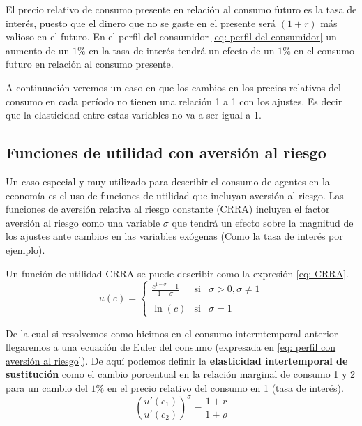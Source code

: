 El precio relativo de consumo presente en relación al consumo futuro es la tasa de interés, puesto que el dinero que no se gaste en el presente será $(1+r)$ más valioso en el futuro. En el perfil del consumidor \ref{eq: perfil del consumidor} un aumento de un $1\%$ en la tasa de interés tendrá un efecto de un $1\%$ en el consumo futuro en relación al consumo presente.

A continuación veremos un caso en que los cambios en los precios relativos del consumo en cada período no tienen una relación 1 a 1 con los ajustes. Es decir que la elasticidad entre estas variables no va a ser igual a 1.

\subsection{Funciones de utilidad con aversión al riesgo}

Un caso especial y muy utilizado para describir el consumo de agentes en la economía es el uso de funciones de utilidad que incluyan aversión al riesgo. Las funciones de aversión relativa al riesgo constante (CRRA) incluyen el factor aversión al riesgo como una variable $\sigma$ que tendrá un efecto sobre la magnitud de los ajustes ante cambios en las variables exógenas (Como la tasa de interés por ejemplo). 

Un función de utilidad CRRA se puede describir como la expresión \ref{eq: CRRA}.
\begin{equation}
    u(c)= \left\{ \begin{array}{lcc} \frac{c^{1-\sigma}-1}{1-\sigma} & \text{si} & \sigma >0,\sigma \neq 1 \\ \\ \ln{(c)} & \text{si} & \sigma = 1 \end{array} \right. \label{eq: CRRA}
\end{equation}

De la cual si resolvemos como hicimos en el consumo intermtemporal anterior llegaremos a una ecuación de Euler del consumo (expresada en \ref{eq: perfil con aversión al riesgo}). De aquí podemos definir la \textbf{elasticidad intertemporal de sustitución} como el cambio porcentual en la relación marginal de consumo 1 y 2 para un cambio del $1\%$ en el precio relativo del consumo en 1 (tasa de interés). 
\begin{equation}
    \left( \frac{u'(c_1)}{u'(c_2)} \right) ^\sigma=  \frac{1+r}{1+\rho}  \label{eq: perfil con aversión al riesgo}
\end{equation}

